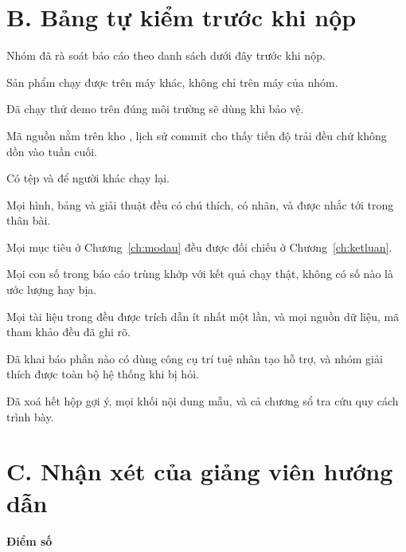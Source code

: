 \section*{B. Bảng tự kiểm trước khi nộp}
{}

Nhóm đã rà soát báo cáo theo danh sách dưới đây trước khi nộp.

\begin{tukiem}
  \item Sản phẩm chạy được trên máy khác, không chỉ trên máy của nhóm.
  \item Đã chạy thử demo trên đúng môi trường sẽ dùng khi bảo vệ.
  \item Mã nguồn nằm trên kho , lịch sử commit cho thấy tiến độ
        trải đều chứ không dồn vào tuần cuối.
  \item Có tệp  và  để người khác chạy lại.
  \item Mọi hình, bảng và giải thuật đều có chú thích, có nhãn, và được nhắc
        tới trong thân bài.
  \item Mọi mục tiêu ở Chương~\ref{ch:modau} đều được đối chiếu ở
        Chương~\ref{ch:ketluan}.
  \item Mọi con số trong báo cáo trùng khớp với kết quả chạy thật, không có
        số nào là ước lượng hay bịa.
  \item Mọi tài liệu trong  đều được trích dẫn ít nhất một
        lần, và mọi nguồn dữ liệu, mã tham khảo đều đã ghi rõ.
  \item Đã khai báo phần nào có dùng công cụ trí tuệ nhân tạo hỗ trợ, và nhóm
        giải thích được toàn bộ hệ thống khi bị hỏi.
  \item Đã xoá hết hộp gợi ý, mọi khối nội dung mẫu, và cả
        chương sổ tra cứu quy cách trình bày.
\end{tukiem}

\section*{C. Nhận xét của giảng viên hướng dẫn}
{}

\khungnhanxet

\vspace{0.8em}
\noindent\begin{minipage}[t]{0.5\textwidth}
\color{daunavy}
{\color{daumaroon}\bfseries Điểm số}

\vspace{0.7em}

\vspace{0.9em}
\end{minipage}\hfill
{}

